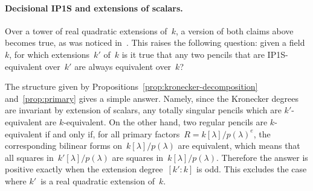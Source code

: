 \documentclass{amsart}
\let\realpar\paragraph
\def\paragraph#1{\realpar{\textbf{#1}}}
\begin{document}
% 

\paragraph{Decisional IP1S and extensions of scalars.}

Over a tower of real quadratic extensions of~$k$,
a version of both claims above becomes true,
as was noticed in~\cite[6.1]{2013bfp}.
This raises the following question: given a field~$k$,
for which extensions~$k'$ of~$k$ is it true that
any two pencils that are IP1S-equivalent over~$k'$
are always equivalent over~$k$?

The structure given by Propositions~\ref{prop:kronecker-decomposition}
and~\ref{prop:primary} gives a simple answer.
Namely, since the Kronecker degrees are invariant by extension of scalars,
any totally singular pencils which are $k'$-equivalent are $k$-equivalent.
On the other hand, two regular pencils are $k$-equivalent
if and only if, for all primary factors~$R =k[λ]/p(λ)^e$,
the corresponding bilinear forms on~$k[λ]/p(λ)$ are equivalent,
which means that all squares in~$k'[λ]/p(λ)$
are squares in~$k[λ]/p(λ)$.
Therefore the answer is positive exactly when
the extension degree~$[k':k]$ is odd.
This excludes the case where $k'$~is a
real quadratic extension of~$k$.

\end{document}
